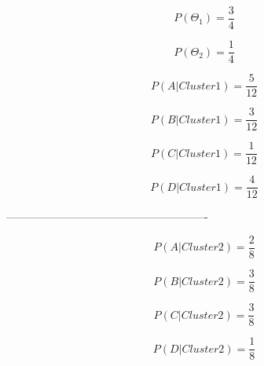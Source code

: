 \begin{boxD}
    \begin{equation*}
        P(\Theta_{1}) = \frac{3}{4}
    \end{equation*}

    \begin{equation*}
        P(\Theta_{2}) = \frac{1}{4}
    \end{equation*}

    \begin{equation*}
        P(A | Cluster1) = \frac{5}{12}
    \end{equation*}

    \begin{equation*}
        P(B | Cluster1) = \frac{3}{12}
    \end{equation*}

    \begin{equation*}
        P(C | Cluster1) = \frac{1}{12}
    \end{equation*}

    \begin{equation*}
        P(D | Cluster1) = \frac{4}{12}
    \end{equation*}

    -------------------------------------------------------

    \begin{equation*}
        P(A | Cluster2) = \frac{2}{8}
    \end{equation*}

    \begin{equation*}
        P(B | Cluster2) = \frac{3}{8}
    \end{equation*}

    \begin{equation*}
        P(C | Cluster2) = \frac{3}{8}
    \end{equation*}

    \begin{equation*}
        P(D | Cluster2) = \frac{1}{8}
    \end{equation*}

    
\end{boxD}



